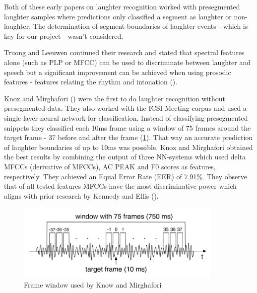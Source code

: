 \documentclass[bsc,frontabs,parskip,deptreport]{infthesis}
\begin{document}
Both of these early papers on laughter recognition worked with presegmented laughter samples where predictions only classified a segment as laughter or non-laughter. The determination of segment boundaries of laughter events - which is key for our project - wasn't considered. 

Truong and Leeuwen continued their research and stated that spectral features alone (such as PLP or MFCC) can be used to discriminate between laughter and speech but a significant improvement can be achieved when using prosodic features - features relating the rhythm and intonation (\cite{truong2007automatic}).

Knox and Mirghafori (\cite{knox2006automatic}) were the first to do laughter recognition without presegmented data. They also worked with the ICSI Meeting corpus and used a single layer neural network for classification. Instead of classifying presegmented snippets they classified each 10ms frame using a window of 75 frames around the target frame - 37 before and after the frame (\ref{fig:know_window}). That way an accurate prediction of laughter boundaries of up to 10ms was possible. 
Knox and Mirghafori obtained the best results by combining the output of three NN-systems which used delta MFCCs (derivative of MFCCs), AC PEAK and F0 scores as features, respectively. They achieved an Equal Error Rate (EER) of 7.91\%. They observe that of all tested features MFCCs have the most discriminative power which aligns with prior research by Kennedy and Ellis (\cite{kennedy2004laughter}).

\begin{figure}[htp]
    \centering
    \includegraphics[width=10cm]{imgs/Knox_window.png}
    \caption{Frame window used by Know and Mirghafori}
    \label{fig:know_window}
\end{figure}
\end{document}
